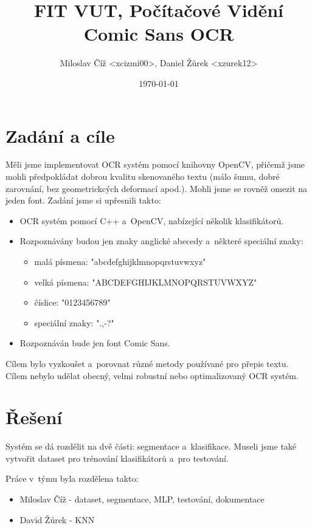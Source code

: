 \documentclass[12pt]{article}
\title{FIT VUT, Počítačové Vidění\\Comic Sans OCR}
\author{Miloslav Číž <xcizmi00>, Daniel Žůrek <xzurek12>}
\date{\today}
\begin{document}
\maketitle

\pagebreak[4]

\section{Zadání a cíle}

Měli jsme implementovat OCR systém pomocí knihovny OpenCV, přičemž jsme mohli
předpokládat dobrou kvalitu skenovaného textu (málo šumu, dobré zarovnání, bez geometrickcých
deformací apod.). Mohli jsme se rovněž omezit na jeden font. Zadání jsme si upřesnili takto:

\begin{itemize}
  \item OCR systém pomocí C++ a~OpenCV, nabízející několik klasifikátorů.
  \item Rozpoznávány budou jen znaky anglické abecedy a~některé speciální znaky:
  \begin{itemize}
    \item malá písmena: "abcdefghijklmnopqrstuvwxyz"
    \item velká písmena: "ABCDEFGHIJKLMNOPQRSTUVWXYZ"
    \item číslice: "0123456789"
    \item speciální znaky: ".,-?"
  \end{itemize}
  \item Rozpoznáván bude jen font Comic Sans.
\end{itemize}

Cílem bylo vyzkoušet a~porovnat různé metody používané pro přepis textu. Cílem nebylo udělat
obecný, velmi robustní nebo optimalizovaný OCR systém.


\section{Řešení}

Systém se dá rozdělit na dvě části: segmentace a~klasifikace. Museli jsme také vytvořit
dataset pro trénování klasifikátorů a~pro testování.

Práce v~týmu byla rozdělena takto:

\begin{itemize}
  \item Miloslav Číž - dataset, segmentace, MLP, testování, dokumentace 
  \item David Žůrek - KNN
\end{itemize}
\end{document}
